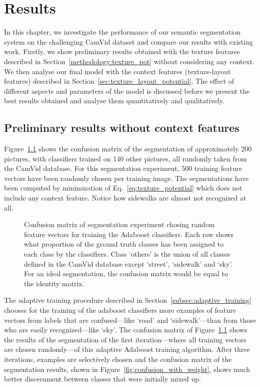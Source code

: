 \chapter{Results} \label{chap:results}

In this chapter, we investigate the performance of our semantic segmentation system on the challenging CamVid dataset and compare our results with existing work. Firstly, we show preliminary results obtained with the texture features described in Section~\ref{methodology:texture_pot} without considering any context. We then analyse our final model with the context features (texture-layout features) described in Section~\ref{sec:texture_layout_potential}. The effect of different aspects and parameters of the model is discussed before we present the best results obtained and analyse them quantitatively and qualitatively.

\section{Preliminary results without context features} \label{sec:result_no_context}

Figure~\ref{fig:confusion_no_weight} shows the confusion matrix of the segmentation of approximately 200 pictures, with classifiers trained on 140 other pictures, all randomly taken from the CamVid database. For this segmentation experiment, 500 training feature vectors have been randomly chosen per training image. The segmentations have been computed by minimization of Eq.~\ref{eq:texture_potential} which does not include any context feature. Notice how sidewalks are almost not recognized at all. 

 \begin{figure}[htb]
\caption[Confusion matrix before adaptive training]{Confusion matrix of segmentation experiment chosing random feature vectors for training the Adaboost classifiers. Each row shows what proportion of the ground truth classes has been assigned to each class by the classifiers. Class `others' is the union of all classes defined in the CamVid database except `street', `sidewalk' and `sky'. For an ideal segmentation, the confusion matrix would be equal to the identity matrix.}
\label{fig:confusion_no_weight}
\end{figure}

The adaptive training procedure described in Section~\ref{subsec:adaptive_training} chooses for the training of the adaboost classifiers more examples of feature vectors from labels that are confused---like `road' and `sidewalk'---than from those who are easily recognized---like `sky'. The confusion matrix of Figure~\ref{fig:confusion_no_weight} shows the results of the segmentation of the first iteration---where all training vectors are chosen randomly---of this adaptive Adaboost training algorithm. After three iterations,  examples are selectively chosen and the confusion matrix of the segmentation results, shown in Figure~\ref{fig:confusion_with_weight}, shows much better discernment between classes that were initially mixed up.

